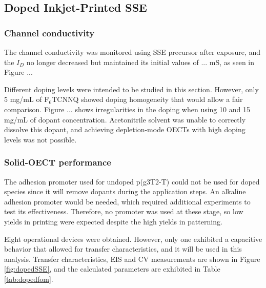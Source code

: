 \newpage
\subsection{Doped Inkjet-Printed SSE} \label{subsec:dopedOECTs}

\subsubsection{Channel conductivity}
The channel conductivity was monitored using SSE precursor after exposure, and the $I_{D}$ no longer decreased but maintained its initial values of ... mS, as seen in Figure ...

Different doping levels were intended to be studied in this section. However, only 5 mg/mL of F$_{6}$TCNNQ showed doping homogeneity that would allow a fair comparison. Figure ... shows irregularities in the doping when using 10 and 15 mg/mL of dopant concentration. Acetonitrile solvent was unable to correctly dissolve this dopant, and achieving depletion-mode OECTs with high doping levels was not possible.

\subsubsection{Solid-OECT performance}

The adhesion promoter used for undoped p(g3T2-T) could not be used for doped species since it will remove dopants during the application steps. An alkaline adhesion promoter would be needed, which required additional experiments to test its effectiveness. Therefore, no promoter was used at these stage, so low yields in printing were expected despite the high yields in patterning.

Eight operational devices were obtained. However, only one exhibited a capacitive behavior that allowed for transfer characteristics, and it will be used in this analysis. Transfer characteristics, EIS and CV measurements are shown in Figure \ref{fig:dopedSSE}, and the calculated parameters are exhibited in Table \ref{tab:dopedfom}.

